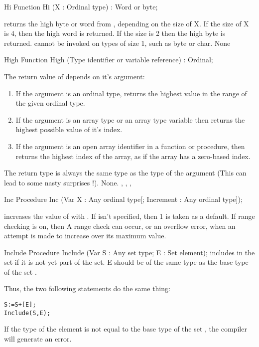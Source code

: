 
\begin{function}{Hi}
\Declaration
Function Hi (X : Ordinal type) : Word or byte;

\Description
{} returns the high byte or word from , depending on the size
of X. If the size of X is 4, then the high word is returned. If the size is
2 then the high byte is returned.
 cannot be invoked on types of size 1, such as byte or char.
\Errors
None
\SeeAlso
{}
\end{function}


\begin{function}{High}
\Declaration
Function High (Type identifier or variable reference) : Ordinal;

\Description
 The return value of  depends on it's argument:
\begin{enumerate}
\item If the argument is an ordinal type,  returns the highest
 value in the range of the given ordinal type.
\item If the argument is an array type or an array type variable then
 returns the highest possible value of it's index.
\item If the argument is an open array identifier in a function or
procedure, then  returns the highest index of the array, as if the
array has a zero-based index.
\end{enumerate}
The return type is always the same type as the type of the argument
(This can lead to some nasty surprises !).
\Errors
None.
\SeeAlso
{}, , , 
\end{function}


\begin{procedure}{Inc}
\Declaration
Procedure Inc (Var X : Any ordinal type[; Increment : Any ordinal type]);

\Description
{} increases the value of  with .
If  isn't specified, then 1 is taken as a default.
\Errors
If range checking is on, then A range check can occur, or an overflow
error, when an attempt is made to increase  over its maximum value.
\SeeAlso
{}
\end{procedure}


\begin{procedure}{Include}
\Declaration
Procedure Include (Var S : Any set type; E : Set element);
\Description
{} includes  in the set  if it is
not yet part of the set. E should be of the same type as the base type
of the set .

Thus, the two following statements do the same thing:
\begin{verbatim}
S:=S+[E];
Include(S,E);
\end{verbatim}
\Errors
If the type of the element  is not equal to the base type of the
set , the compiler will generate an error.
\SeeAlso
{}
\end{procedure}

